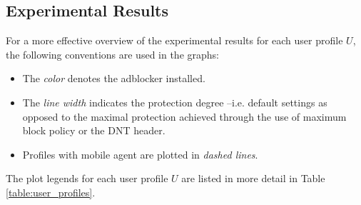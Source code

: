 \documentclass{sig-alternate}
\begin{document}
\subsection{Experimental Results}
{\color{blue} For a more effective overview of the experimental results for each user profile $U$, the following conventions are used in the graphs:
\begin{itemize}
 \item The \textit{color} denotes the adblocker installed.
 \item The \textit{line width} indicates the protection degree --i.e. default settings as opposed to the maximal protection achieved through the use of maximum block policy or the DNT header.
 \item Profiles with mobile agent are plotted in \textit{dashed lines}.
\end{itemize}
The plot legends for each user profile $U$ are listed in more detail in Table \ref{table:user_profiles}.
}

  \newcommand\solidthinrule[1][.5cm]{\rule[0.5ex]{#1}{.4pt}}
  \newcommand\solidthickrule[1][.5cm]{\rule[0.5ex]{#1}{1.5pt}}
  \newcommand\dashedthinrule{\mbox{%
    \solidthinrule[1mm]\hspace{1mm}\solidthinrule[1mm]\hspace{1mm}\solidthinrule[1mm]}}
  \newcommand\dashedthickrule{\mbox{%
    \solidthickrule[1mm]\hspace{1mm}\solidthickrule[1mm]\hspace{1mm}\solidthickrule[1mm]}}
\end{document}
